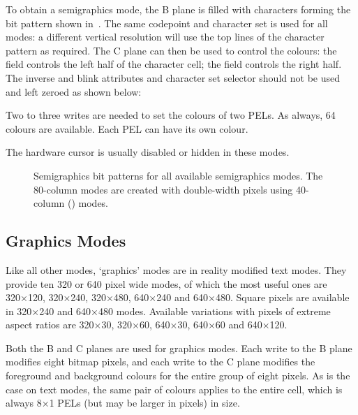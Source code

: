 To obtain a semigraphics mode, the B plane is filled with characters forming
the bit pattern shown in~. The same codepoint
and character set is used for all modes: a different vertical resolution will
use the top lines of the character pattern as required. The C plane can then be
used to control the colours: the  field controls the left
half of the character cell; the  field controls the right
half. The inverse and blink attributes and  character set selector
should not be used and left zeroed as shown below:

\begin{bitfield}
\end{bitfield}

Two to three writes are needed to set the colours of two \glspl{PEL}. As always, 64
colours are available. Each PEL can have its own colour.

The hardware cursor is usually disabled or hidden in these modes.

\begin{figure}
 \centering
 \caption[Semigraphics bit patterns]{\label{fig:semigraphics-bit-pattern}
   Semigraphics bit patterns for all available semigraphics modes. The
   80-column modes are created with double-width pixels using 40-column
   () modes.}
\end{figure}


\subsection{Graphics Modes}

Like all other modes, ‘graphics’ modes are in reality modified text modes. They
provide ten 320 or 640 pixel wide modes, of which the most useful ones are
320×120, 320×240, 320×480, 640×240 and 640×480. Square pixels are available in
320×240 and 640×480 modes. Available variations with pixels of extreme aspect
ratios are 320×30, 320×60, 640×30, 640×60 and 640×120.

Both the B and C planes are used for graphics modes. Each write to the B plane
modifies eight bitmap pixels, and each write to the C plane modifies the
foreground and background colours for the entire group of eight pixels. As is
the case on text modes, the same pair of colours applies to the entire cell,
which is always 8×1 \glspl{PEL} (but may be larger in pixels) in size.

